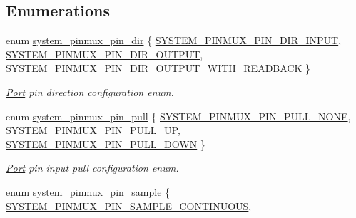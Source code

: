 \subsection*{Enumerations}
\begin{DoxyCompactItemize}
\item 
enum \mbox{\hyperlink{group__asfdoc__sam0__system__pinmux__group_gaef5ed797ec6ce6e7f2ca4bafd3f77df2}{system\+\_\+pinmux\+\_\+pin\+\_\+dir}} \{ \mbox{\hyperlink{group__asfdoc__sam0__system__pinmux__group_ggaef5ed797ec6ce6e7f2ca4bafd3f77df2ae9eec757570dd8e703060cd249076f29}{S\+Y\+S\+T\+E\+M\+\_\+\+P\+I\+N\+M\+U\+X\+\_\+\+P\+I\+N\+\_\+\+D\+I\+R\+\_\+\+I\+N\+P\+UT}}, 
\mbox{\hyperlink{group__asfdoc__sam0__system__pinmux__group_ggaef5ed797ec6ce6e7f2ca4bafd3f77df2ab20cb484d8d81cea0eccd85608636f8a}{S\+Y\+S\+T\+E\+M\+\_\+\+P\+I\+N\+M\+U\+X\+\_\+\+P\+I\+N\+\_\+\+D\+I\+R\+\_\+\+O\+U\+T\+P\+UT}}, 
\mbox{\hyperlink{group__asfdoc__sam0__system__pinmux__group_ggaef5ed797ec6ce6e7f2ca4bafd3f77df2ae7f0fe12708b38583366e7f09c37f413}{S\+Y\+S\+T\+E\+M\+\_\+\+P\+I\+N\+M\+U\+X\+\_\+\+P\+I\+N\+\_\+\+D\+I\+R\+\_\+\+O\+U\+T\+P\+U\+T\+\_\+\+W\+I\+T\+H\+\_\+\+R\+E\+A\+D\+B\+A\+CK}}
 \}
\begin{DoxyCompactList}\small\item\em \mbox{\hyperlink{struct_port}{Port}} pin direction configuration enum. \end{DoxyCompactList}\item 
enum \mbox{\hyperlink{group__asfdoc__sam0__system__pinmux__group_ga936e823e4b08dc981d39c273182eb1c6}{system\+\_\+pinmux\+\_\+pin\+\_\+pull}} \{ \mbox{\hyperlink{group__asfdoc__sam0__system__pinmux__group_gga936e823e4b08dc981d39c273182eb1c6a6de6c84525642ff68da72bc3dd5fad4b}{S\+Y\+S\+T\+E\+M\+\_\+\+P\+I\+N\+M\+U\+X\+\_\+\+P\+I\+N\+\_\+\+P\+U\+L\+L\+\_\+\+N\+O\+NE}}, 
\mbox{\hyperlink{group__asfdoc__sam0__system__pinmux__group_gga936e823e4b08dc981d39c273182eb1c6ac9fa59589685abc00e18426750100e35}{S\+Y\+S\+T\+E\+M\+\_\+\+P\+I\+N\+M\+U\+X\+\_\+\+P\+I\+N\+\_\+\+P\+U\+L\+L\+\_\+\+UP}}, 
\mbox{\hyperlink{group__asfdoc__sam0__system__pinmux__group_gga936e823e4b08dc981d39c273182eb1c6a0dec6136103bdccb64576c9bf431ae41}{S\+Y\+S\+T\+E\+M\+\_\+\+P\+I\+N\+M\+U\+X\+\_\+\+P\+I\+N\+\_\+\+P\+U\+L\+L\+\_\+\+D\+O\+WN}}
 \}
\begin{DoxyCompactList}\small\item\em \mbox{\hyperlink{struct_port}{Port}} pin input pull configuration enum. \end{DoxyCompactList}\item 
enum \mbox{\hyperlink{group__asfdoc__sam0__system__pinmux__group_gac0c5f124b2d0deed3751156f20135994}{system\+\_\+pinmux\+\_\+pin\+\_\+sample}} \{ \mbox{\hyperlink{group__asfdoc__sam0__system__pinmux__group_ggac0c5f124b2d0deed3751156f20135994ac6a9b047d924787a9bd6df78eb92bf36}{S\+Y\+S\+T\+E\+M\+\_\+\+P\+I\+N\+M\+U\+X\+\_\+\+P\+I\+N\+\_\+\+S\+A\+M\+P\+L\+E\+\_\+\+C\+O\+N\+T\+I\+N\+U\+O\+US}}, 

\end{DoxyCompactItemize}
